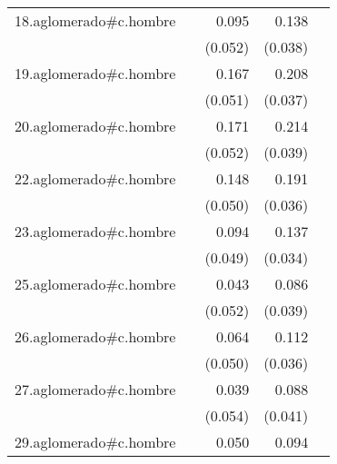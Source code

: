 {\begin{longtable}{l*{4}{D{.}{.}{-1}}}
\addlinespace
18.aglomerado#c.hombre&                     &       0.095         &       0.138\sym{***}&                     \\
            &                     &     (0.052)         &     (0.038)         &                     \\
\addlinespace
19.aglomerado#c.hombre&                     &       0.167\sym{***}&       0.208\sym{***}&                     \\
            &                     &     (0.051)         &     (0.037)         &                     \\
\addlinespace
20.aglomerado#c.hombre&                     &       0.171\sym{**} &       0.214\sym{***}&                     \\
            &                     &     (0.052)         &     (0.039)         &                     \\
\addlinespace
22.aglomerado#c.hombre&                     &       0.148\sym{**} &       0.191\sym{***}&                     \\
            &                     &     (0.050)         &     (0.036)         &                     \\
\addlinespace
23.aglomerado#c.hombre&                     &       0.094         &       0.137\sym{***}&                     \\
            &                     &     (0.049)         &     (0.034)         &                     \\
\addlinespace
25.aglomerado#c.hombre&                     &       0.043         &       0.086\sym{*}  &                     \\
            &                     &     (0.052)         &     (0.039)         &                     \\
\addlinespace
26.aglomerado#c.hombre&                     &       0.064         &       0.112\sym{**} &                     \\
            &                     &     (0.050)         &     (0.036)         &                     \\
\addlinespace
27.aglomerado#c.hombre&                     &       0.039         &       0.088\sym{*}  &                     \\
            &                     &     (0.054)         &     (0.041)         &                     \\
\addlinespace
29.aglomerado#c.hombre&                     &       0.050         &       0.094\sym{**} &                     \\

\end{longtable}}
